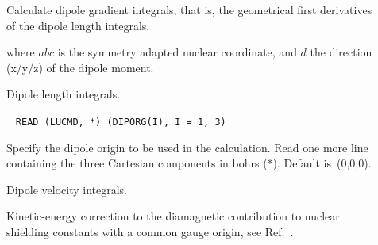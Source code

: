 \begin{description}
\item[]

Calculate dipole gradient integrals, that is, the geometrical first
derivatives of the dipole length integrals.

where $abc$ is the symmetry adapted nuclear coordinate, and $d$ the
direction (x/y/z) of the dipole moment.

\item[] Dipole length integrals.


\item[]\verb| |\newline
\verb|READ (LUCMD, *) (DIPORG(I), I = 1, 3)|

Specify the dipole origin to be used in the
calculation.
Read one more line containing the three Cartesian
components in bohrs (*). Default is~(0,0,0).

\item[] Dipole velocity integrals.


\item[] Kinetic-energy correction to the diamagnetic
contribution to nuclear shielding constants with a common gauge
origin, see Ref.~\cite{pmpljvkrjcp119}.



\end{description}
